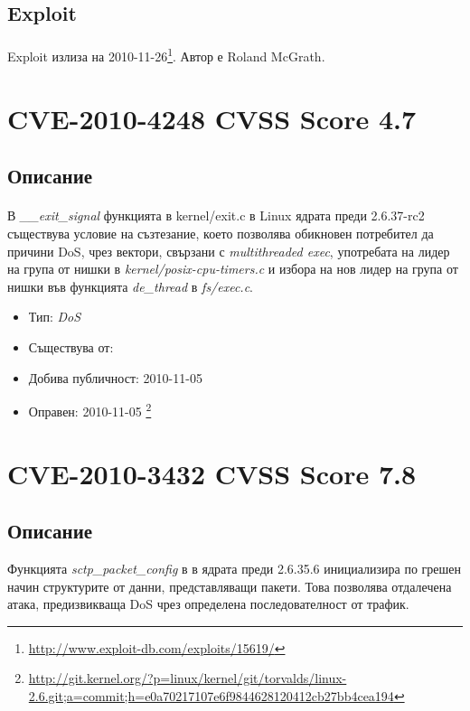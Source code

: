 \documentclass[a4paper,12pt,leqno]{article}
\begin{document}
\subsection{Exploit}
\paragraph{}
Exploit излиза на 2010-11-26\footnote{\url{http://www.exploit-db.com/exploits/15619/}}. Автор е Roland McGrath.


\section{CVE-2010-4248 CVSS Score 4.7}
\subsection{Описание}
\paragraph{}
В \textit{\_\_exit\_signal} функцията в kernel/exit.c в Linux ядрата преди  2.6.37-rc2 съществува условие на съзтезание, което позволява обикновен потребител да причини DoS, чрез вектори, свързани с \textit{multithreaded exec}, употребата на лидер на група от нишки в \textit{kernel/posix-cpu-timers.c} и избора на нов лидер на група от нишки във функцията \textit{de\_thread} в \textit{fs/exec.c}.

\begin{itemize}
    \item Тип: \textit{DoS}
    \item Съществува от:
  	\item Добива публичност: 2010-11-05
    \item Оправен: 2010-11-05 \footnote{\url{http://git.kernel.org/?p=linux/kernel/git/torvalds/linux-2.6.git;a=commit;h=e0a70217107e6f9844628120412cb27bb4cea194}}
\end{itemize}

\section{CVE-2010-3432 CVSS Score 7.8} %
\label{sec:CVE-2010-3432 Score 7.8}
\subsection{Описание}
Функцията \textit{sctp\_packet\_config} в  в ядрата преди 2.6.35.6 инициализира по
грешен начин структурите от данни, представляващи пакети. Това позволява отдалечена атака, предизвикваща DoS чрез определена последователност от  трафик.
\end{document}
